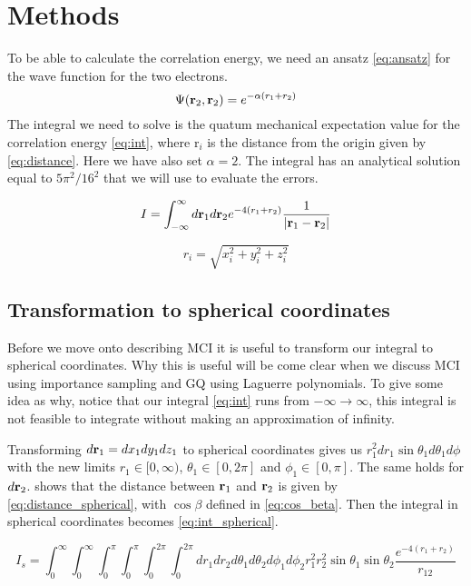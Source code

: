 \section{Methods}
To be able to calculate the correlation energy, we need an ansatz \cref{eq:ansatz} for the
wave function for the two electrons.
\begin{equation}\label{eq:ansatz}
  \Psi(\mathbf{r}_2, \mathbf{r}_2) = e^{-\alpha(r_1 + r_2)}
\end{equation}
The integral we need to solve is the quatum
mechanical expectation value for the correlation energy \cref{eq:int}, where r$_i$ is the distance from the
origin given by \cref{eq:distance}. Here we have also set $\alpha = 2$. The integral has an analytical solution
equal to $5\pi^2/16^2$ that we will use to evaluate the errors.

\begin{equation}
  \label{eq:int}
  I = \int_{-\infty}^{\infty} d\mathbf{r}_1 d\mathbf{r}_2 e^{-4(r_1+r_2)}
  \frac{1}{\abs{\mathbf{r}_1 - \mathbf{r}_2}}
\end{equation}

\begin{equation}
  \label{eq:distance}
r_i = \sqrt{x_i^2 + y_i^2 + z_i^2}
\end{equation}

\subsection{Transformation to spherical coordinates}
Before we move onto describing MCI it is useful to transform our integral to
spherical coordinates. Why this is useful will be come clear when we discuss
MCI using importance sampling and GQ using Laguerre polynomials. To give some idea
as why, notice that our integral \cref{eq:int} runs from $-\infty \to \infty$,
this integral is not feasible to integrate without making an approximation of infinity.

Transforming $d\mathbf{r}_1 = dx_1dy_1dz_1$ to spherical coordinates gives us
$r_1^2 dr_1 \sin{\theta_1}d\theta_1 d\phi$ with the new limits $r_1 \in [0, \infty)$,
 $\theta_1 \in [0, 2\pi]$ and $\phi_1 \in [0,\pi]$. The same holds for $d\mathbf{r}_2$.
\parencite{lectures} shows that the distance between $\mathbf{r}_1$ and $\mathbf{r}_2$ is given by
\cref{eq:distance_spherical}, with $\cos{\beta}$ defined in \cref{eq:cos_beta}.
Then the integral in spherical coordinates becomes \cref{eq:int_spherical}.

\begin{equation}
  \label{eq:int_spherical}
  I_s = \int_{0}^{\infty} \int_{0}^{\infty} \int_{0}^{\pi} \int_{0}^{\pi}
  \int_{0}^{2\pi} \int_{0}^{2\pi}
  dr_1 dr_2 d\theta_1 d\theta_2 d\phi_1 d\phi_2
  r_1^2 r_2^2 \sin{\theta_1} \sin{\theta_2} \frac{e^{-4(r_1 + r_2)}}{r_{12}}
\end{equation}

